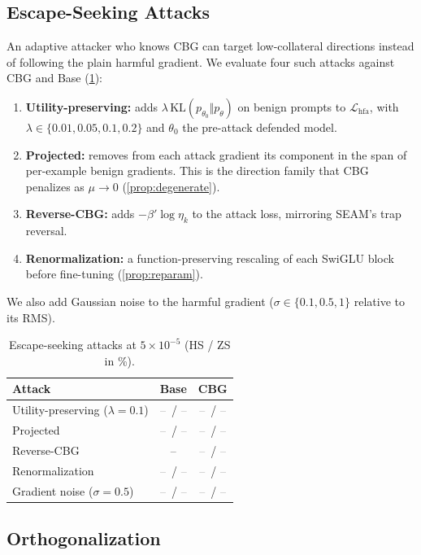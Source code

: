 \documentclass[11pt]{article}
\newcommand{\Lhfa}{\mathcal{L}_{\mathrm{hfa}}}
\newcommand{\etak}{\eta_{k}}
\newcommand{\tbd}{\textcolor{gray}{--}}
\begin{document}
\subsection{Escape-Seeking Attacks}
\label{sec:adaptive}

An adaptive attacker who knows CBG can target low-collateral directions instead of following the plain harmful gradient. We evaluate four such attacks against CBG and Base (\cref{tab:adaptive}):
\begin{enumerate}
  \item \textbf{Utility-preserving:} adds $\lambda\,\mathrm{KL}(p_{\theta_0}\Vert p_\theta)$ on benign prompts to $\Lhfa$, with $\lambda\in\{0.01,0.05,0.1,0.2\}$ and $\theta_0$ the pre-attack defended model.
  \item \textbf{Projected:} removes from each attack gradient its component in the span of per-example benign gradients. This is the direction family that CBG penalizes as $\mu\to0$ (\cref{prop:degenerate}).
  \item \textbf{Reverse-CBG:} adds $-\beta'\log\etak$ to the attack loss, mirroring SEAM's trap reversal.
  \item \textbf{Renormalization:} a function-preserving rescaling of each SwiGLU block before fine-tuning (\cref{prop:reparam}).
\end{enumerate}
We also add Gaussian noise to the harmful gradient ($\sigma\in\{0.1,0.5,1\}$ relative to its RMS).

\begin{table}[t]
\centering
\small
\caption{Escape-seeking attacks at $5\times10^{-5}$ (HS / ZS in \%).}
\label{tab:adaptive}
\begin{tabular}{lcc}
\toprule
Attack & Base & CBG\\
\midrule
Utility-preserving ($\lambda=0.1$) & \tbd\ / \tbd & \tbd\ / \tbd\\
Projected                          & \tbd\ / \tbd & \tbd\ / \tbd\\
Reverse-CBG                        & -- & \tbd\ / \tbd\\
Renormalization                    & \tbd\ / \tbd & \tbd\ / \tbd\\
Gradient noise ($\sigma=0.5$)      & \tbd\ / \tbd & \tbd\ / \tbd\\
\bottomrule
\end{tabular}
\end{table}




\subsection{Orthogonalization}
\label{sec:orthogonal}
\end{document}
